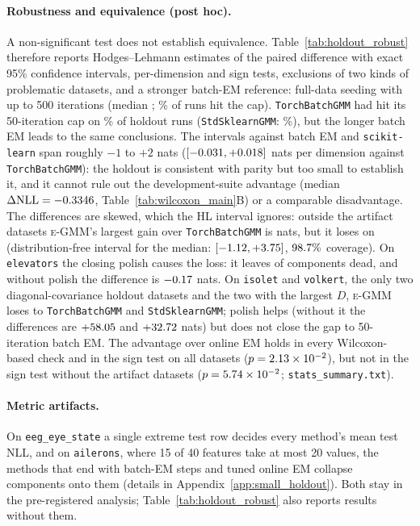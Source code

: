 \documentclass[10pt]{article} %
\newcommand{\egmm}{\textsc{e-GMM}}
\begin{document}
\paragraph{Robustness and equivalence (post hoc).} A non-significant test does not establish equivalence. Table~\ref{tab:holdout_robust} therefore reports Hodges--Lehmann estimates of the paired difference with exact 95\% confidence intervals, per-dimension and sign tests, exclusions of two kinds of problematic datasets, and a stronger batch-EM reference: full-data seeding with up to 500 iterations (median \rConvIterMed{}; \rConvCapShare\% of runs hit the cap). \texttt{TorchBatchGMM} had hit its 50-iteration cap on \rCapShareTB\% of holdout runs (\texttt{StdSklearnGMM}: \rCapShareSK\%), but the longer batch EM leads to the same conclusions. The intervals against batch EM and \texttt{scikit-learn} span roughly $-1$ to $+2$ nats ($[-0.031, +0.018]$ nats per dimension against \texttt{TorchBatchGMM}): the holdout is consistent with parity but too small to establish it, and it cannot rule out the development-suite advantage (median $\Delta\mathrm{NLL} = -0.3346$, Table~\ref{tab:wilcoxon_main}B) or a comparable disadvantage. The differences are skewed, which the HL interval ignores: outside the artifact datasets \egmm{}'s largest gain over \texttt{TorchBatchGMM} is \rRTorchBatchGMMMaxGain{} nats, but it loses on \rRTorchBatchGMMBigLosses{} (distribution-free interval for the median: $[-1.12, +3.75]$, $98.7\%$ coverage). On \texttt{elevators} the closing polish causes the loss: it leaves \rHDeadOnelevators{} of \rHKOnelevators{} components dead, and without polish the difference is $-0.17$ nats. On \texttt{isolet} and \texttt{volkert}, the only two diagonal-covariance holdout datasets and the two with the largest $D$, \egmm{} loses to \texttt{TorchBatchGMM} and \texttt{StdSklearnGMM}; polish helps (without it the differences are $+58.05$ and $+32.72$ nats) but does not close the gap to 50-iteration batch EM. The advantage over online EM holds in every Wilcoxon-based check and in the sign test on all datasets ($p = 2.13\times 10^{-2}$), but not in the sign test without the artifact datasets ($p = 5.74\times 10^{-2}$; \texttt{stats\_summary.txt}).

\paragraph{Metric artifacts.} On \texttt{eeg\_eye\_state} a single extreme test row decides every method's mean test NLL, and on \texttt{ailerons}, where 15 of 40 features take at most 20 values, the methods that end with batch-EM steps and tuned online EM collapse components onto them (details in Appendix~\ref{app:small_holdout}). Both stay in the pre-registered analysis; Table~\ref{tab:holdout_robust} also reports results without them.
\end{document}
